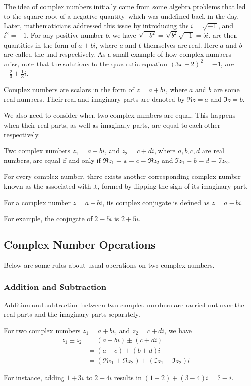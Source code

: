 The idea of complex numbers initially came from some algebra problems that led to the square root of a negative quantity, which was undefined back in the day. Later, mathematicians addressed this issue by introducing the  $i = \sqrt{-1}$, and $i^2 = -1$. For any positive number $b$, we have $\sqrt{-b^2} = \sqrt{b^2}\sqrt{-1} = bi$.  are then quantities in the form of $a + bi$, where $a$ and $b$ themselves are real. Here $a$ and $b$ are called the  and  respectively. As a small example of how complex numbers arise, note that the solutions to the quadratic equation $(3x+2)^2 = -1$, are $-\frac{2}{3} \pm \frac{1}{3}i$.
\begin{defn}
Complex numbers are scalars in the form of $z = a + bi$, where $a$ and $b$ are some real numbers. Their real and imaginary parts are denoted by $\Re{z} = a$ and $\Im{z} = b$.
\end{defn}
We also need to consider when two complex numbers are equal. This happens when their real parts, as well as imaginary parts, are equal to each other respectively.
\begin{proper}
Two complex numbers $z_1 = a + bi$, and $z_2 = c + di$, where $a, b, c, d$ are real numbers, are equal if and only if $\Re{z_1} = a = c = \Re{z_2}$ and $\Im{z_1} = b = d = \Im{z_2}$.
\end{proper}
For every complex number, there exists another corresponding complex number known as the  associated with it, formed by flipping the sign of its imaginary part.
\begin{defn}
For a complex number $z = a + bi$, its complex conjugate is defined as $\overline{z} = a - bi$.
\end{defn}
For example, the conjugate of $2-5i$ is $2+5i$.

\subsection{Complex Number Operations}
Below are some rules about usual operations on two complex numbers.
\subsubsection{Addition and Subtraction}
Addition and subtraction between two complex numbers are carried out over the real parts and the imaginary parts separately.
\begin{defn}
For two complex numbers $z_1 = a + bi$, and $z_2 = c + di$, we have
\begin{align}
z_1 \pm z_2 &= (a + bi) \pm (c + di) \nonumber \\
&= (a \pm c) + (b \pm d)i \nonumber \\
&= (\Re{z_1} \pm \Re{z_2}) + (\Im{z_1} \pm \Im{z_2})i    
\end{align}
\end{defn}
For instance, adding $1 + 3i$ to $2 - 4i$ results in $(1+2) + (3-4)i = 3 - i$.

